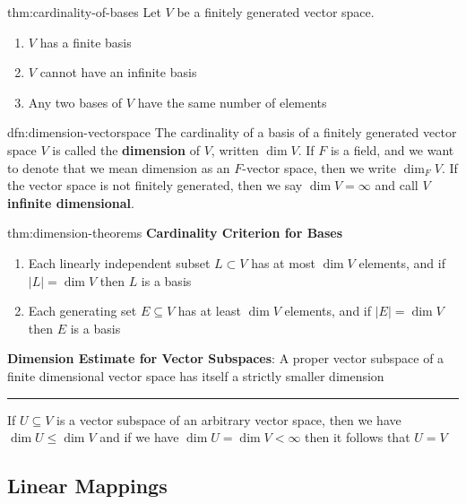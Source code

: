 \documentclass[landscape, 8pt]{extarticle}
\begin{document}
\begin{multicols}{3}
\begin{thm}{thm:cardinality-of-bases}{}
    Let $V$ be a finitely generated vector space.
    \begin{enumerate}
        \setlength\itemsep{0em}
        \item $V$ has a finite basis
        \item $V$ cannot have an infinite basis
        \item Any two bases of $V$ have the same number of elements
    \end{enumerate}
\end{thm}

\begin{dfn}{dfn:dimension-vectorspace}{}
    The cardinality of a basis of a finitely generated vector space $V$ is called the \textbf{dimension} of $V$, written $\dim V$. If $F$ is a field, and we want to denote that we mean dimension as an $F$-vector space, then we write $\dim_{F} V$. If the vector space is not finitely generated, then we say $\dim V = \infty$ and call $V$ \textbf{infinite dimensional}. 
\end{dfn} 

\begin{thm}{thm:dimension-theorems}{}
    \textbf{Cardinality Criterion for Bases}
    \begin{enumerate}
        \setlength\itemsep{0em}
        \item Each linearly independent subset $L \subset V$ has at most $\dim V$ elements, and if $\lvert L \rvert = \dim V$ then $L$ is a basis
        \item Each generating set $E \subseteq V$ has at least $\dim V$ elements, and if $\lvert E \rvert = \dim V$ then $E$ is a basis
    \end{enumerate}
    \textbf{Dimension Estimate for Vector Subspaces}: A proper vector subspace of a finite dimensional vector space has itself a strictly smaller dimension

    \noindent\rule{\textwidth}{0.2pt}
    If $U \subseteq V$ is a vector subspace of an arbitrary vector space, then we have $\dim U \le \dim V$ and if we have $\dim U = \dim V < \infty$ then it follows that $U = V$
\end{thm}

\subsection{Linear Mappings}


\end{multicols}
\end{document}
